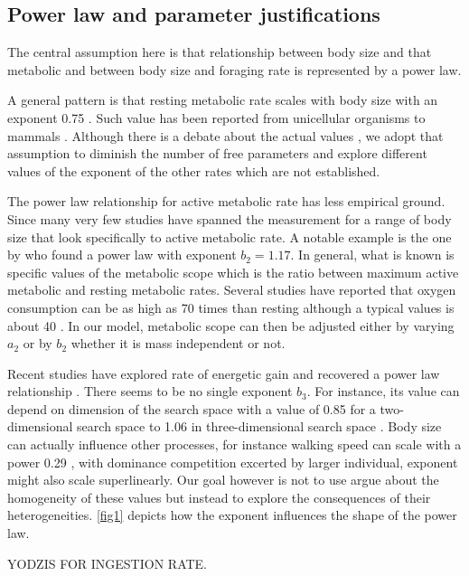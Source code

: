 \subsection*{Power law and parameter justifications}
The central assumption here is that relationship between body size and that metabolic and between body size and foraging rate is represented by a power law.

A general pattern is that resting metabolic rate scales with body size with an exponent 0.75 \citep{Kleiber1947, Peters1986, Brown2004}.
Such value has been reported from unicellular organisms to mammals \citep{Brown2004}.
Although there is a debate about the actual values \citep[e.g.,][]{Isaac2010}, we adopt that assumption to diminish the number of free parameters and explore different values of the exponent of the other rates which are not established.

The power law relationship for active metabolic rate has less empirical ground.
Since many very few studies have spanned the measurement for a range of body size that look specifically to active metabolic rate.
A notable example is the one by \citet{Bartholomew1978} who found a power law with exponent $b_2 = 1.17$.
In general, what is known is specific values of the metabolic scope which is the ratio between maximum active metabolic and resting metabolic rates.
Several studies have reported that oxygen consumption can be as high as 70 times than resting although a typical values is about 40 \citep{Bartholomew1981}.  
In our model, metabolic scope can then be adjusted either by varying $a_2$  or by $b_2$ whether it is mass independent or not. 

Recent studies have explored rate of energetic gain and recovered a power law relationship \citep{Maino2015, Pawar2012}.
There seems to be no single exponent $b_3$.
For instance, its value can depend on dimension of the search space with a value of 0.85 for a two-dimensional search space to 1.06 in three-dimensional search space \citep{Pawar2012}.
Body size can actually influence other processes, for instance walking speed  can scale with a power 0.29 \citep{Peters1986}, with dominance competition excerted by larger individual, exponent might also scale superlinearly.
Our goal however is not to use argue about the homogeneity of these values but instead to explore the consequences of their heterogeneities.
\cref{fig1} depicts how the exponent influences the shape of the power law.

YODZIS FOR INGESTION RATE.

